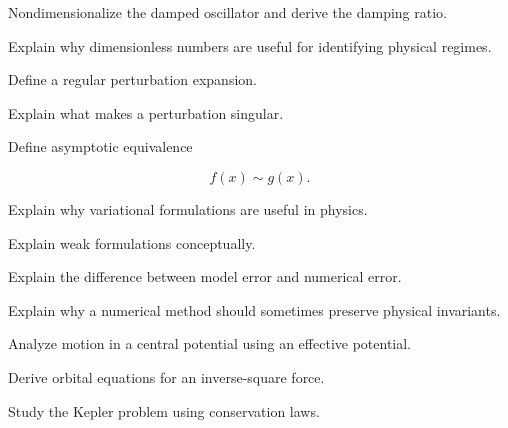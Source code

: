 \begin{exercise}[3]
Nondimensionalize the damped oscillator and derive the damping ratio.
\end{exercise}

\begin{exercise}[3]
Explain why dimensionless numbers are useful for identifying physical
regimes.
\end{exercise}

\begin{exercise}[2]
Define a regular perturbation expansion.
\end{exercise}

\begin{exercise}[3]
Explain what makes a perturbation singular.
\end{exercise}

\begin{exercise}[3]
Define asymptotic equivalence

\[
f(x)\sim g(x).
\]
\end{exercise}

\begin{exercise}[3]
Explain why variational formulations are useful in physics.
\end{exercise}

\begin{exercise}[3]
Explain weak formulations conceptually.
\end{exercise}

\begin{exercise}[3]
Explain the difference between model error and numerical error.
\end{exercise}

\begin{exercise}[3]
Explain why a numerical method should sometimes preserve physical
invariants.
\end{exercise}

\begin{exercise}[4]
Analyze motion in a central potential using an effective potential.
\end{exercise}

\begin{exercise}[4]
Derive orbital equations for an inverse-square force.
\end{exercise}

\begin{exercise}[4]
Study the Kepler problem using conservation laws.
\end{exercise}

